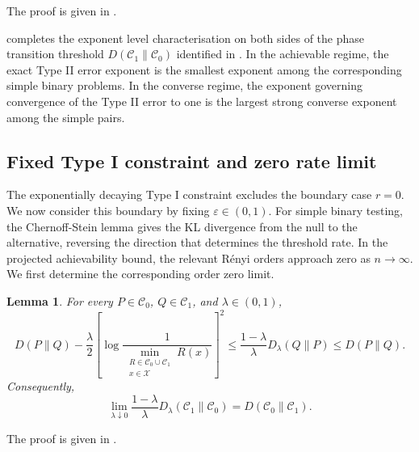 \documentclass[journal,10pt,draftclsnofoot,onecolumn]{IEEEtran}
\newtheorem{lemma}{Lemma}
\begin{document}
The proof is given in .

 completes the exponent level characterisation on both sides of the phase transition threshold $D(\mathcal C_1\|\mathcal C_0)$ identified in . In the achievable regime, the exact Type II error exponent is the smallest exponent among the corresponding simple binary problems. In the converse regime, the exponent governing convergence of the Type II error to one is the largest strong converse exponent among the simple pairs.


\subsection{Fixed Type I constraint and zero rate limit}
\label{sec:fixed-type-one}

The exponentially decaying Type I constraint excludes the boundary case $r=0$. We now consider this boundary by fixing $\varepsilon\in(0,1)$. For simple binary testing, the Chernoff-Stein lemma gives the KL divergence from the null to the alternative, reversing the direction that determines the threshold rate. In the projected achievability bound, the relevant R\'enyi orders approach zero as $n\to\infty$. We first determine the corresponding order zero limit.

\begin{lemma}
\label{lem:order-zero-limit}
For every $P\in\mathcal C_0$, $Q\in\mathcal C_1$, and $\lambda\in(0,1)$,
\begin{equation*}
D(P\|Q)-\frac{\lambda}{2} \left[\log\frac{1}{\min_{\substack{R\in\mathcal C_0\cup\mathcal C_1\\ x\in\mathcal X}} R(x)}\right]^2 \leq\frac{1-\lambda}{\lambda} D_\lambda(Q\|P) \leq D(P\|Q).
\end{equation*}
Consequently,
\begin{equation}
\lim_{\lambda\downarrow0} \frac{1-\lambda}{\lambda} D_\lambda(\mathcal C_1\|\mathcal C_0)= D(\mathcal C_0\|\mathcal C_1).
\label{eq:order-zero-limit}
\end{equation}
\end{lemma}
The proof is given in .
\end{document}
